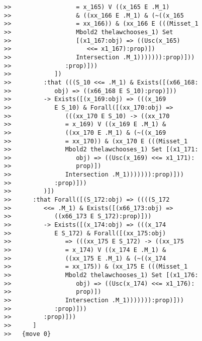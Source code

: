 \documentclass[12pt]{article}
\begin{document}
\begin{verbatim}
>>                  = x_165) V ((x_165 E .M_1)
>>                  & ((xx_166 E .M_1) & (~((x_165
>>                  = xx_166)) & (xx_166 E (((Misset_1
>>                  Mbold2 thelawchooses_1) Set
>>                  [(x1_167:obj) => ((Usc(x_165)
>>                     <<= x1_167):prop)])
>>                  Intersection .M_1))))))):prop)]))
>>               :prop)]))
>>            ])
>>         :that (((S_10 <<= .M_1) & Exists([(x66_168:
>>            obj) => ((x66_168 E S_10):prop)]))
>>         -> Exists([(x_169:obj) => (((x_169
>>            E S_10) & Forall([(xx_170:obj) =>
>>               (((xx_170 E S_10) -> ((xx_170
>>               = x_169) V ((x_169 E .M_1) &
>>               ((xx_170 E .M_1) & (~((x_169
>>               = xx_170)) & (xx_170 E (((Misset_1
>>               Mbold2 thelawchooses_1) Set [(x1_171:
>>                  obj) => ((Usc(x_169) <<= x1_171):
>>                  prop)])
>>               Intersection .M_1))))))):prop)]))
>>            :prop)]))
>>         )])
>>      :that Forall([(S_172:obj) => ((((S_172
>>         <<= .M_1) & Exists([(x66_173:obj) =>
>>            ((x66_173 E S_172):prop)]))
>>         -> Exists([(x_174:obj) => (((x_174
>>            E S_172) & Forall([(xx_175:obj)
>>               => (((xx_175 E S_172) -> ((xx_175
>>               = x_174) V ((x_174 E .M_1) &
>>               ((xx_175 E .M_1) & (~((x_174
>>               = xx_175)) & (xx_175 E (((Misset_1
>>               Mbold2 thelawchooses_1) Set [(x1_176:
>>                  obj) => ((Usc(x_174) <<= x1_176):
>>                  prop)])
>>               Intersection .M_1))))))):prop)]))
>>            :prop)]))
>>         :prop)]))
>>      ]
>>   {move 0}


\end{verbatim}
\end{document}
